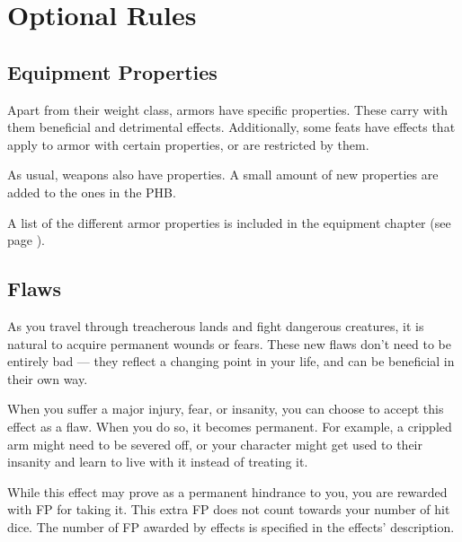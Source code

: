 \section{Optional Rules} \label{sec::optionalrules}
\subsection*{Equipment Properties} \label{ssec::equipmentproperties1}
    Apart from their weight class, armors have specific properties.
    These carry with them beneficial and detrimental effects.
    Additionally, some feats have effects that apply to armor with certain properties, or are restricted by them.

    As usual, weapons also have properties.
    A small amount of new properties are added to the ones in the PHB.

    A list of the different armor properties is included in the equipment chapter (see page \pageref{ssec::armorproperties}).





\subsection*{Flaws} \label{ssec::flaws}
    As you travel through treacherous lands and fight dangerous creatures, it is natural to acquire permanent wounds or fears.
    These new flaws don't need to be entirely bad --- they reflect a changing point in your life, and can be beneficial in their own way.

    When you suffer a major injury, fear, or insanity, you can choose to accept this effect as a flaw.
    When you do so, it becomes permanent.
    For example, a crippled arm might need to be severed off, or your character might get used to their insanity and learn to live with it instead of treating it.

    While this effect may prove as a permanent hindrance to you, you are rewarded with FP for taking it.
    This extra FP does not count towards your number of hit dice.
    The number of FP awarded by effects is specified in the effects' description.


